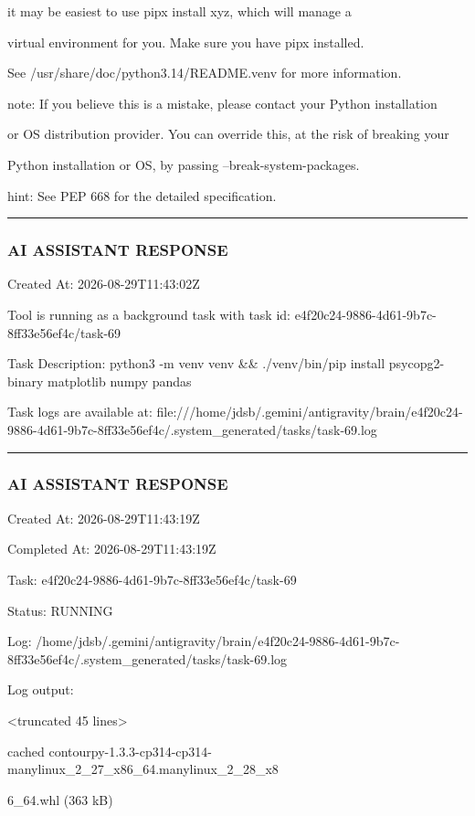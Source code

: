\documentclass[11pt,a4paper]{article}
\begin{document}
it may be easiest to use pipx install xyz, which will manage a

virtual environment for you. Make sure you have pipx installed.


See /usr/share/doc/python3.14/README.venv for more information.


note: If you believe this is a mistake, please contact your Python installation

or OS distribution provider. You can override this, at the risk of breaking your

Python installation or OS, by passing --break-system-packages.

hint: See PEP 668 for the detailed specification.


\hrule

\subsubsection{AI ASSISTANT RESPONSE}

Created At: 2026-08-29T11:43:02Z

Tool is running as a background task with task id: e4f20c24-9886-4d61-9b7c-8ff33e56ef4c/task-69

Task Description: python3 -m venv venv \&\& ./venv/bin/pip install psycopg2-binary matplotlib numpy pandas

Task logs are available at: file:///home/jdsb/.gemini/antigravity/brain/e4f20c24-9886-4d61-9b7c-8ff33e56ef4c/.system\_generated/tasks/task-69.log


\hrule

\subsubsection{AI ASSISTANT RESPONSE}

Created At: 2026-08-29T11:43:19Z

Completed At: 2026-08-29T11:43:19Z

Task: e4f20c24-9886-4d61-9b7c-8ff33e56ef4c/task-69

Status: RUNNING

Log: /home/jdsb/.gemini/antigravity/brain/e4f20c24-9886-4d61-9b7c-8ff33e56ef4c/.system\_generated/tasks/task-69.log

Log output:

<truncated 45 lines>

cached contourpy-1.3.3-cp314-cp314-manylinux\_2\_27\_x86\_64.manylinux\_2\_28\_x8

6\_64.whl (363 kB)
\end{document}
